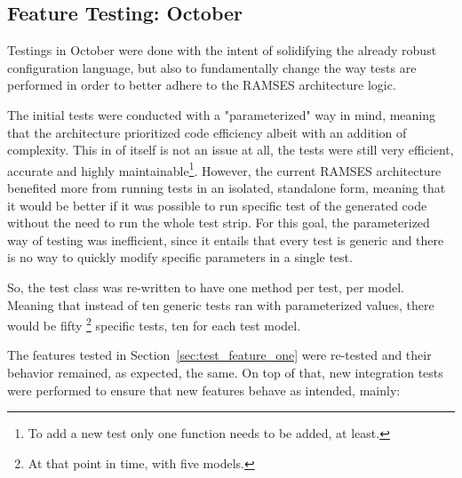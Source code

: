 \subsection{Feature Testing: October}
\label{sec:test_feature_two}

Testings in October were done with the intent of solidifying the already robust configuration language, but also to fundamentally change the way tests are performed in order to better adhere to the \gls{RAMSES} architecture logic.

The initial tests were conducted with a "parameterized" way in mind, meaning that the architecture prioritized code efficiency albeit with an addition of complexity. This in of itself is not an issue at all, the tests were still very efficient, accurate and highly maintainable\footnote{To add a new test only one function needs to be added, at least.}. However, the current \gls{RAMSES} architecture benefited more from running tests in an isolated, standalone form, meaning that it would be better if it was possible to run specific test of the generated code without the need to run the whole test strip. For this goal, the parameterized way of testing was inefficient, since it entails that every test is generic and there is no way to quickly modify specific parameters in a single test.

So, the test class was re-written to have one method per test, per model. Meaning that instead of ten generic tests ran with parameterized values, there would be fifty \footnote{At that point in time, with five models.} specific tests, ten for each test model.

The features tested in Section~\ref{sec:test_feature_one} were re-tested and their behavior remained, as expected, the same. On top of that, new integration tests were performed to ensure that new features behave as intended, mainly:

